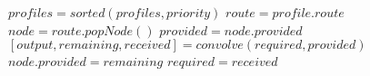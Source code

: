 \documentclass{standalone}
\begin{document}
\begin{varwidth}{\linewidth}
\par\noindent
 \begin{algorithmic}[1]
   \State $profiles = sorted(profiles,priority)$
   \State $route = profile.route$
   \State $node = route.popNode()$
   \State $provided = node.provided$
   \State $[output, remaining, received] = convolve(required, provided)$
   \State $node.provided = remaining$
   \State $required = received$
   \EndWhile
   \EndFor
   \EndProcedure
 \end{algorithmic}
\end{varwidth}
\end{document}
